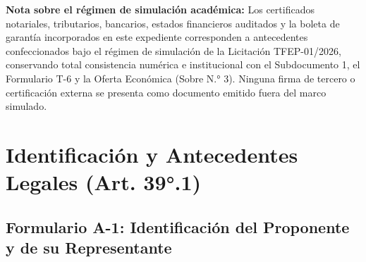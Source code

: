 \documentclass{audit-oferta}
\begin{document}
\noindent\textbf{Nota sobre el régimen de simulación académica:} Los certificados notariales, tributarios, bancarios, estados financieros auditados y la boleta de garantía incorporados en este expediente corresponden a antecedentes confeccionados bajo el régimen de simulación de la Licitación TFEP-01/2026, conservando total consistencia numérica e institucional con el Subdocumento 1, el Formulario T-6 y la Oferta Económica (Sobre N.° 3). Ninguna firma de tercero o certificación externa se presenta como documento emitido fuera del marco simulado.

\clearpage

\section{Identificación y Antecedentes Legales (Art. 39°.1)}\label{sec:s1-a1}

\subsection*{Formulario A-1: Identificación del Proponente y de su Representante}
\end{document}
